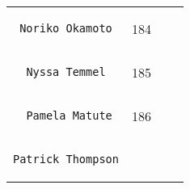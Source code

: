 \documentclass[]{article}
\begin{document}
\begin{longtable}[c]{@{}llll@{}}
\begin{minipage}[t]{0.39\columnwidth}\raggedright
\begin{verbatim}
 Noriko Okamoto
\end{verbatim}
\end{minipage} & \begin{minipage}[t]{0.10\columnwidth}\raggedright
184
\end{minipage} & \begin{minipage}[t]{0.13\columnwidth}\raggedright
\end{minipage} & \begin{minipage}[t]{0.15\columnwidth}\raggedright
\end{minipage}
\\\noalign{\medskip}
\begin{minipage}[t]{0.39\columnwidth}\raggedright
\begin{verbatim}
  Nyssa Temmel
\end{verbatim}
\end{minipage} & \begin{minipage}[t]{0.10\columnwidth}\raggedright
185
\end{minipage} & \begin{minipage}[t]{0.13\columnwidth}\raggedright
\end{minipage} & \begin{minipage}[t]{0.15\columnwidth}\raggedright
\end{minipage}
\\\noalign{\medskip}
\begin{minipage}[t]{0.39\columnwidth}\raggedright
\begin{verbatim}
  Pamela Matute
\end{verbatim}
\end{minipage} & \begin{minipage}[t]{0.10\columnwidth}\raggedright
186
\end{minipage} & \begin{minipage}[t]{0.13\columnwidth}\raggedright
\end{minipage} & \begin{minipage}[t]{0.15\columnwidth}\raggedright
\end{minipage}
\\\noalign{\medskip}
\begin{minipage}[t]{0.39\columnwidth}\raggedright
\begin{verbatim}
Patrick Thompson
\end{verbatim}
\end{minipage} & \begin{minipage}[t]{0.10\columnwidth}\raggedright

\end{minipage}
\end{longtable}
\end{document}
